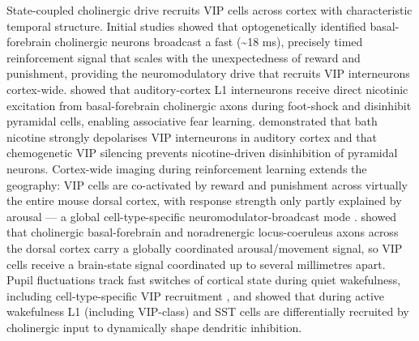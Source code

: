 \documentclass[11pt]{article}
\begin{document}
State-coupled cholinergic drive recruits VIP cells across cortex with characteristic temporal structure. Initial studies \citep{Hangya2015} showed that optogenetically identified basal-forebrain cholinergic neurons broadcast a fast ({\textasciitilde}18 ms), precisely timed reinforcement signal that scales with the unexpectedness of reward and punishment, providing the neuromodulatory drive that recruits VIP interneurons cortex-wide. \citet{Letzkus2011} showed that auditory-cortex L1 interneurons receive direct nicotinic excitation from basal-forebrain cholinergic axons during foot-shock and disinhibit pyramidal cells, enabling associative fear learning. \citet{Askew2019} demonstrated that bath nicotine strongly depolarises VIP interneurons in auditory cortex and that chemogenetic VIP silencing prevents nicotine-driven disinhibition of pyramidal neurons. Cortex-wide imaging during reinforcement learning extends the geography: VIP cells are co-activated by reward and punishment across virtually the entire mouse dorsal cortex, with response strength only partly explained by arousal --- a global cell-type-specific neuromodulator-broadcast mode \citep{Szadai2022}. \citet{Collins2023} showed that cholinergic basal-forebrain and noradrenergic locus-coeruleus axons across the dorsal cortex carry a globally coordinated arousal/movement signal, so VIP cells receive a brain-state signal coordinated up to several millimetres apart. Pupil fluctuations track fast switches of cortical state during quiet wakefulness, including cell-type-specific VIP recruitment \citep{Reimer2014}, and \citet{Munoz2017} showed that during active wakefulness L1 (including VIP-class) and SST cells are differentially recruited by cholinergic input to dynamically shape dendritic inhibition.
\end{document}
